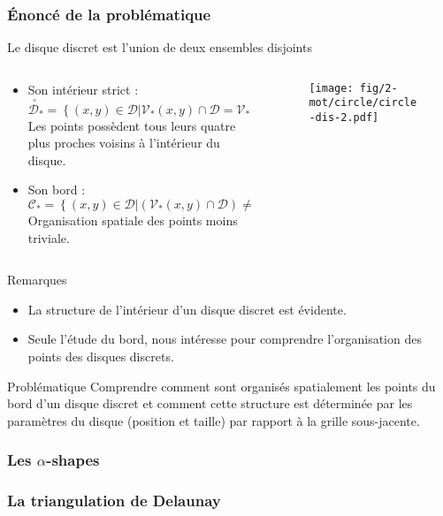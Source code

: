 \begin{frame}
\frametitle{Énoncé de la problématique}
\begin{block}{Le disque discret est l’union de deux ensembles disjoints}
  \begin{columns}[t]
    \begin{column}{0.65\linewidth}
      \begin{itemize}      
        \item Son intérieur strict :
        $\stackrel{\ \circ}{\mathcal{D}}_{*} =  \left\{ (x,y) \in \mathcal{D} | \mathcal{V}_{*}(x,y) \cap \mathcal{D} = \mathcal{V}_{*}(x,y) \right\}$\\
        Les points possèdent tous leurs quatre plus proches voisins à l’intérieur du disque.
        \item Son bord : \\ 
        $\mathcal{C}_{*} =  \left\{ (x,y) \in \mathcal{D} | \left( \mathcal{V}_{*}(x,y) \cap \mathcal{D} \right) \neq \mathcal{V}_{*}(x,y) \right\}$\\
        Organisation spatiale des points moins triviale.
      \end{itemize}
    \end{column}
 
    \begin{column}{0.35\linewidth}
      \begin{figure}[H]
        \centering
        \texttt{[image: fig/2-mot/circle/circle-dis-2.pdf]}
       \end{figure}
    \end{column}
  \end{columns}
\end{block}


{
  \begin{exampleblock}{Remarques}
    \begin{itemize}
      \item La structure de l’intérieur d'un disque discret est évidente.
      \item Seule l’étude du bord, nous intéresse pour comprendre l’organisation des points des disques discrets.
    \end{itemize}
  \end{exampleblock} 
}
{
  \begin{alertblock}{Problématique}
    Comprendre comment sont organisés spatialement les points du bord d’un disque discret et comment cette structure est déterminée par les paramètres du disque (position et taille) par rapport à la grille sous-jacente.
  \end{alertblock}

}





\end{frame}

\begin{frame}
\frametitle{Les $\alpha$-shapes}

\end{frame}

\begin{frame}
\frametitle{La triangulation de Delaunay}

\end{frame}
